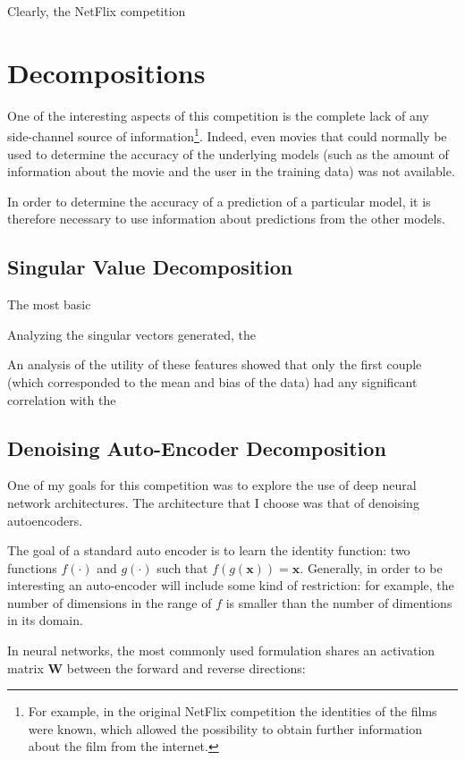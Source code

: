 \documentclass{article}
\begin{document}
Clearly, the NetFlix competition 


\section{Decompositions}

One of the interesting aspects of this competition is the complete lack of any
side-channel source of information\footnote{For example, in the original NetFlix
competition the identities of the films were known, which allowed the
possibility to obtain further information about the film from the internet.}.  Indeed, even movies that could normally be used to determine the accuracy of the underlying models (such as the amount of information about the movie and the user in the training data) was not available.

In order to determine the accuracy of a prediction of a particular model, it is
therefore necessary to use information about predictions from the other models.

\subsection{Singular Value Decomposition}

The most basic

Analyzing the singular vectors generated, the 


An analysis of the utility of these features showed that only the first couple
(which corresponded to the mean and bias of the data) had any significant
correlation with the 

\subsection{Denoising Auto-Encoder Decomposition}

One of my goals for this competition was to explore the use of deep neural network architectures.  The architecture that I choose was that of denoising autoencoders.

The goal of a standard auto encoder is to learn the identity function: two functions $f(\cdot)$ and $g(\cdot)$ such that $f(g(\mathbf{x})) = \mathbf{x}$.  Generally, in order to be interesting an auto-encoder will include some kind of restriction: for example, the number of dimensions in the range of $f$ is smaller than the number of dimentions in its domain.

In neural networks, the most commonly used formulation shares an activation matrix $\mathbf{W}$ between the forward and reverse directions:
\end{document}
